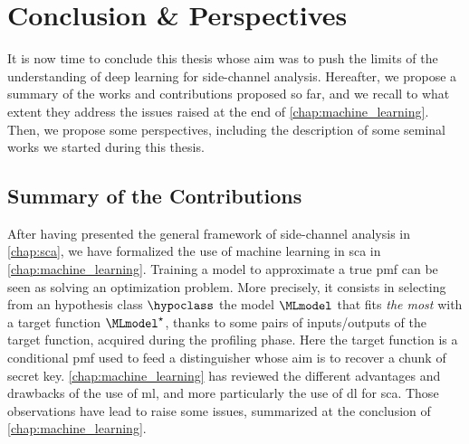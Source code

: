 \chapter{Conclusion \& Perspectives}

It is now time to conclude this thesis whose aim was to push the limits of the understanding of deep learning for side-channel analysis.
Hereafter, we propose a summary of the works and contributions proposed so far, and we recall to what extent they address the issues raised at the end of \autoref{chap:machine_learning}.
Then, we propose some perspectives, including the description of some seminal works we started during this thesis.

\section{Summary of the Contributions}
	After having presented the general framework of side-channel analysis in \autoref{chap:sca}, we have formalized the use of machine learning in \gls{sca} in \autoref{chap:machine_learning}.
	Training a model to approximate a true \gls{pmf} can be seen as solving an optimization problem.
	More precisely, it consists in selecting from an hypothesis class \(\hypoclass\) the model \(\MLmodel\) that fits \emph{the most} with a target function \(\MLmodel^\star\), thanks to some pairs of inputs/outputs of the target function, acquired during the profiling phase.
	Here the target function is a conditional \gls{pmf} used to feed a distinguisher whose aim is to recover a chunk of secret key.
	\autoref{chap:machine_learning} has reviewed the different advantages and drawbacks of the use of \gls{ml}, and more particularly the use of \gls{dl} for \gls{sca}.
	Those observations have lead to raise some issues, summarized at the conclusion of \autoref{chap:machine_learning}.

